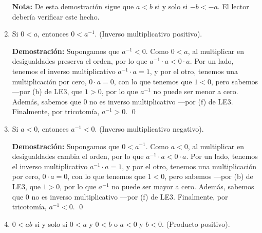 \documentclass[11pt]{article}
\begin{document}
\begin{enumerate}[label=\alph*)]
    \textbf{Nota:} De esta demostración sigue que $a<b$ si y solo si $-b<-a$. El lector debería verificar este hecho.    

    \item Si $0<a$, entonces $0<a^{-1}$. (Inverso multiplicativo positivo).
    
    \textbf{Demostración:} Supongamos que $a^{-1}<0$. Como $0<a$, al multiplicar en desigualdades preserva el orden, por lo que $a^{-1} \cdot a<0 \cdot a$. Por un lado, tenemos el inverso multiplicativo $a^{-1} \cdot a = 1$, y por el otro, tenemos una multiplicación por cero, $0\cdot a=0$, con lo que tenemos que $1<0$, pero sabemos —por (b) de LE3, que $1>0$, por lo que $a^{-1}$ no puede ser menor a cero. Además, sabemos que $0$ no es inverso multiplicativo —por (f) de LE3. Finalmente, por tricotomía, $a^{-1}>0$. \qed

    \item Si $a<0$, entonces $a^{-1}<0$. (Inverso multiplicativo negativo).
    
    \textbf{Demostración:} Supongamos que $0<a^{-1}$. Como $a<0$, al multiplicar en desigualdades cambia el orden, por lo que $a^{-1} \cdot a < 0 \cdot a$. Por un lado, tenemos el inverso multiplicativo $a^{-1}\cdot a =1$, y por el otro, tenemos una multiplicación por cero, $0\cdot a =0$, con lo que tenemos que $1<0$, pero sabemos —por (b) de LE3, que $1>0$, por lo que $a^{-1}$ no puede ser mayor a cero. Además, sabemos que $0$ no es inverso multiplicativo —por (f) de LE3. Finalmente, por tricotomía, $a^{-1}<0$. \qed
    
    \item $0<ab$ si y solo si $0<a$ y $0<b$ o $a<0$ y $b<0$. (Producto positivo).
    

\end{enumerate}
\end{document}
